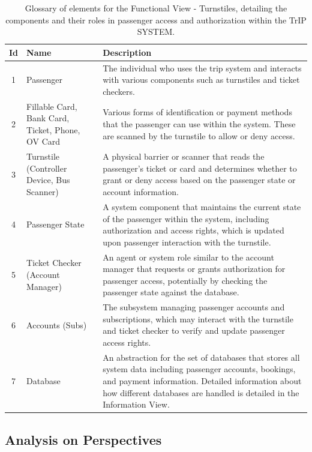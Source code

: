 \begin{table}[H]
    \centering
    \begin{tabular}{@{}clp{9cm}@{}} %
    \toprule
    \textbf{Id} & \textbf{Name} & \textbf{Description} \\
    \midrule
    1 & Passenger & The individual who uses the trip system and interacts with various components such as turnstiles and ticket checkers. \\
    2 & Fillable Card, Bank Card, Ticket, Phone, OV Card & Various forms of identification or payment methods that the passenger can use within the system. These are scanned by the turnstile to allow or deny access. \\
    3 & Turnstile (Controller Device, Bus Scanner) & A physical barrier or scanner that reads the passenger's ticket or card and determines whether to grant or deny access based on the passenger state or account information. \\
    4 & Passenger State & A system component that maintains the current state of the passenger within the system, including authorization and access rights, which is updated upon passenger interaction with the turnstile. \\
    5 & Ticket Checker (Account Manager) & An agent or system role similar to the account manager that requests or grants authorization for passenger access, potentially by checking the passenger state against the database. \\
    6 & Accounts (Subs) & The subsystem managing passenger accounts and subscriptions, which may interact with the turnstile and ticket checker to verify and update passenger access rights. \\
    7 & Database & An abstraction for the set of databases that stores all system data including passenger accounts, bookings, and payment information. Detailed information about how different databases are handled is detailed in the Information View.\\
    \bottomrule
    \end{tabular}
    \caption{Glossary of elements for the Functional View - Turnstiles, detailing the components and their roles in passenger access and authorization within the TrIP SYSTEM.}
    \label{tab:glossary_turnstiles}
\end{table}

\subsection{Analysis on Perspectives}

